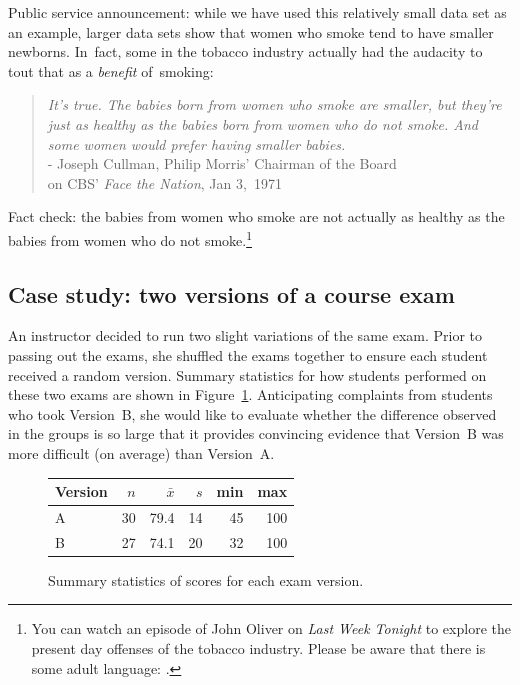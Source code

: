 Public service announcement: while we have used this relatively small data set as an example, larger data sets show that women who smoke tend to have smaller newborns. In~fact, some in the tobacco industry actually had the audacity to tout that as a \emph{benefit} of~smoking:
\begin{quotation}
\noindent\emph{It's true. The babies born from women who smoke are smaller, but they're just as healthy as the babies born from women who do not smoke. And some women would prefer having smaller babies.} \\[2mm]
\indent\indent\indent\indent\indent\indent- Joseph Cullman, Philip Morris' Chairman of the Board \\
\indent\indent\indent\indent\indent{}on CBS' \emph{Face the Nation}, Jan 3,~1971
\end{quotation}
Fact check: the babies from women who smoke are not actually as healthy as the babies from women who do not smoke.\footnote{You can watch an episode of John Oliver on \emph{Last Week Tonight} to explore the present day offenses of the tobacco industry. Please be aware that there is some adult language: .}



\subsection{Case study: two versions of a course exam}


An instructor decided to run two slight variations of the same exam. Prior to passing out the exams, she shuffled the exams together to ensure each student received a random version. Summary statistics for how students performed on these two exams are shown in Figure~\ref{summaryStatsForTwoVersionsOfExams}. Anticipating complaints from students who took Version~B, she would like to evaluate whether the difference observed in the groups is so large that it provides convincing evidence that Version~B was more difficult (on average) than Version~A.

\begin{figure}[hht]
\centering
\begin{tabular}{l rrrrr}
\hline
Version\hspace{2mm}	& $n$	& $\bar{x}$	& $s$	& min	& max  \\
\hline
A		& 30		& 79.4		& 14 	& 45		& 100 \\
B		& 27		& 74.1		& 20		& 32		& 100 \\
\hline
\end{tabular}
\caption{Summary statistics of scores for each exam version.}
\label{summaryStatsForTwoVersionsOfExams}
\end{figure}

